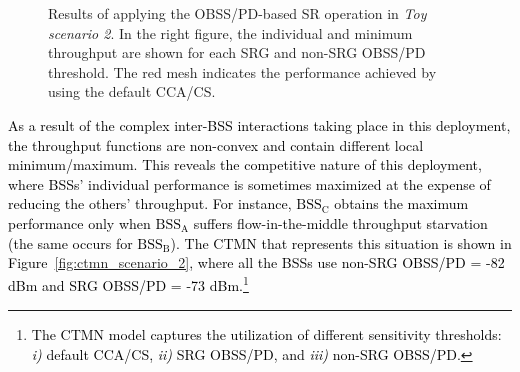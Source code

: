 \documentclass[preprint,12pt]{elsarticle}
\theoremstyle{plain}
\begin{document}
\begin{figure}[ht!]
	\centering
	\caption{Results of applying the OBSS/PD-based SR operation in \emph{Toy scenario 2}. In the right figure, the individual and minimum throughput are shown for each SRG and non-SRG OBSS/PD threshold. The red mesh indicates the performance achieved by using the default CCA/CS.}
	\label{fig:SIM_1_3}
\end{figure}

\textcolor{black}{As a result of the complex inter-BSS interactions taking place in this deployment, the throughput functions are non-convex and contain different local minimum/maximum. This reveals the competitive nature of this deployment, where BSSs' individual performance is sometimes maximized at the expense of reducing the others' throughput. For instance, $\text{BSS}_\text{C}$ obtains the maximum performance only when $\text{BSS}_\text{A}$ suffers flow-in-the-middle throughput starvation (the same occurs for $\text{BSS}_\text{B}$). The CTMN that represents this situation is shown in Figure~\ref{fig:ctmn_scenario_2}, where all the BSSs use non-SRG OBSS/PD = -82 dBm and SRG OBSS/PD = -73 dBm.\footnote{\textcolor{black}{The CTMN model captures the utilization of different sensitivity thresholds: \emph{i)} default CCA/CS, \emph{ii)} SRG OBSS/PD, and \emph{iii)} non-SRG OBSS/PD.}}}
\end{document}
